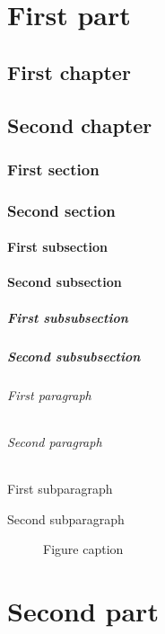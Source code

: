 \documentclass[noprint,nocopyright,baselinegrid]{uit-thesis-test}
\begin{document}
\frontmatter
\tableofcontents

\mainmatter

\part{First part}
\chapter{First chapter}
\chapter{Second chapter}
\section{First section}
\section{Second section}
\subsection{First subsection}
\subsection{Second subsection}
\subsubsection{First subsubsection}
\subsubsection{Second subsubsection}
\paragraph{First paragraph}
\paragraph{Second paragraph}
\subparagraph{First subparagraph}
\subparagraph{Second subparagraph}

\begin{figure}
\centering
{}
\caption{Figure caption}
\end{figure}

\part{Second part}
\end{document}
